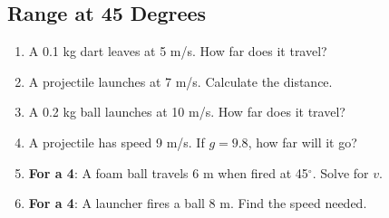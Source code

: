\documentclass{article}
\begin{document}
\subsection{Range at 45 Degrees}
\begin{enumerate}
    \item A 0.1 kg dart leaves at 5 m/s. How far does it travel?
    \item A projectile launches at 7 m/s. Calculate the distance.
    \item A 0.2 kg ball launches at 10 m/s. How far does it travel?
    \item A projectile has speed 9 m/s. If $g=9.8$, how far will it go?
    \item \textbf{For a 4}: A foam ball travels 6 m when fired at 45$^\circ$. Solve for $v$.
    \item \textbf{For a 4}: A launcher fires a ball 8 m. Find the speed needed.
\end{enumerate}
\end{document}
